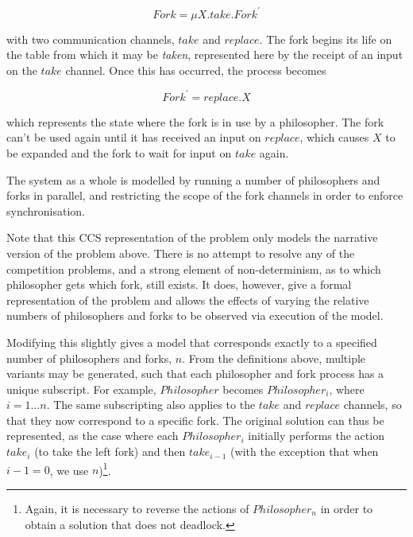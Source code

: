 \begin{equation}
Fork = \mu X.take.Fork^\prime
\end{equation}

\noindent with two communication channels, $take$ and
$replace$.  The fork begins its life on the table from which it
may be \emph{taken}, represented here by the receipt of an input on
the $take$ channel.  Once this has occurred, the process becomes

\begin{equation}
Fork^\prime = replace.X
\end{equation}

\noindent which represents the state where the fork is in use by a
philosopher.  The fork can't be used again until it has received an
input on $replace$, which causes $X$ to be expanded and the fork to
wait for input on $take$ again.

  The system as a whole is modelled by running a number of
  philosophers and forks in parallel, and restricting the scope of the
  fork channels in order to enforce synchronisation.


Note that this CCS representation of the problem only models the
narrative version of the problem above.  There is no attempt to
resolve any of the competition problems, and a strong element of
non-determinism, as to which philosopher gets which fork, still
exists.  It does, however, give a formal representation of the problem
and allows the effects of varying the relative numbers of philosophers
and forks to be observed via execution of the model.

Modifying this slightly gives a model that corresponds
exactly to a specified number of philosophers and forks, $n$.  From
the definitions above, multiple variants may be generated, such that
each philosopher and fork process has a unique subscript.  For
example, $Philosopher$ becomes $Philosopher_i$, where $i = 1\dots n$.
The same subscripting also applies to the $take$ and $replace$
channels, so that they now correspond to a specific fork.  The
original solution can thus be represented, as the case where each
$Philosopher_i$ initially performs the action $take_i$ (to take
the left fork) and then $take_{i-1}$ (with the exception that when
$i-1 = 0$, we use $n$)\footnote{Again, it is necessary to reverse the
  actions of $Philosopher_n$ in order to obtain a solution that does not
  deadlock.}.

